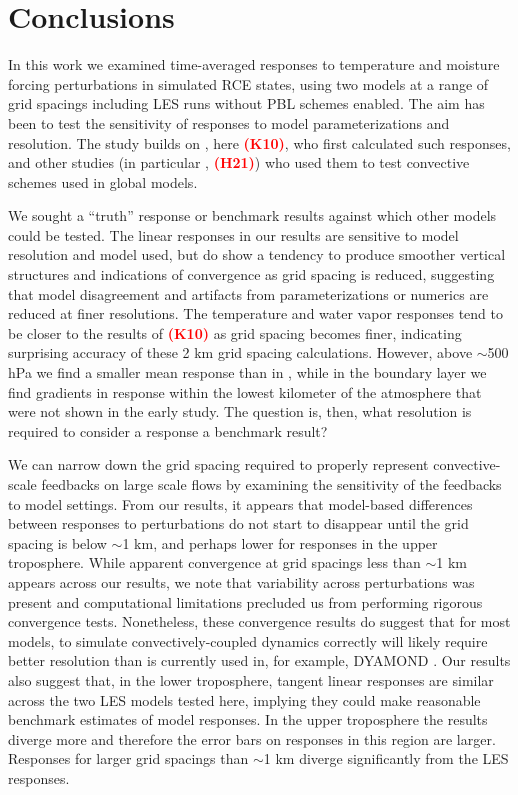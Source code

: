 \documentclass[draft]{agujournal2019}
\newcommand{\todo}[1]{\textcolor{red}{\textbf{(#1)}}}
\begin{document}
\section{Conclusions}
\label{sec:conclusions}

In this work we examined time-averaged responses to temperature and moisture
forcing perturbations in simulated RCE states, using two models at a range of
grid spacings including LES runs without PBL schemes enabled. The aim has been
to test the sensitivity of responses to model parameterizations and resolution.
The study builds on , here \todo{K10}, who first calculated such responses, and other studies (in particular , \todo{H21}) who used them to test convective schemes used in global models.

We sought a ``truth'' response or benchmark results against which other models
could be tested. The linear responses in our results are sensitive to model
resolution and model used, but do show a tendency to produce smoother vertical
structures and indications of convergence as grid spacing is reduced, suggesting that model
disagreement and artifacts from parameterizations or numerics are reduced at finer
resolutions. 
The temperature and water vapor responses tend to be
closer to the results of \todo{K10} as grid spacing becomes finer,
indicating surprising accuracy of these 2 km grid
spacing calculations. However, above $\sim$500 hPa we find a smaller mean response
than in , while in the boundary layer we find gradients in response within the lowest kilometer of the atmosphere that were not shown in the early study. The question is, then, what resolution is
required to consider a response a benchmark result?

We can narrow down the grid spacing required to properly represent
convective-scale feedbacks on large scale flows by examining the sensitivity of
the feedbacks to model settings. From our results, it appears that model-based
differences between responses to perturbations do not start to disappear until
the grid spacing is below $\sim$1 km, and perhaps lower for responses in the
upper troposphere. While apparent convergence at grid spacings less than $\sim$1
km appears across our results, we note that variability across perturbations was
present and computational limitations precluded us from performing rigorous
convergence tests. Nonetheless, these convergence results do suggest that for
most models, to simulate convectively-coupled dynamics correctly will likely
require better resolution than is currently used in, for example, DYAMOND
\cite{Stevens_PEPS_2019}. Our results also suggest that, in the lower
troposphere, tangent linear responses are similar across the two LES models
tested here, implying they could make reasonable benchmark estimates of model
responses. In the upper troposphere the results diverge more and therefore the
error bars on responses in this region are larger. Responses for larger grid
spacings than $\sim$1 km diverge significantly from the LES responses.
\end{document}
